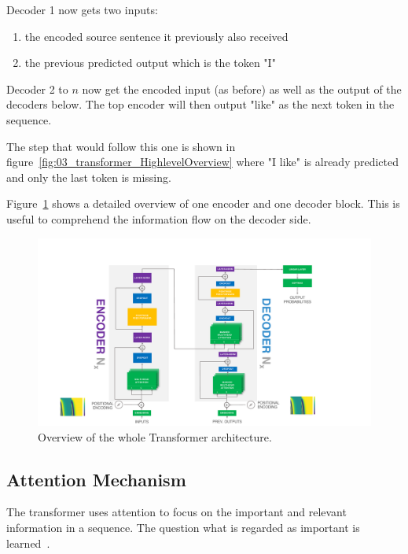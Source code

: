Decoder 1 now gets two inputs: 

\begin{enumerate}
	\item the encoded source sentence it previously also received
	\item the previous predicted output which is the token "I"
\end{enumerate}

Decoder 2 to $n$ now get the encoded input {(as before)} as well as the output of the decoders below. The top encoder will then output "like" as the next token in the sequence. 

The step that would follow this one is shown in figure~\ref{fig:03_transformer_HighlevelOverview} where "I like" is already predicted and only the last token is missing.
\bigskip

Figure~\ref{fig:03_transformer_overview} shows a detailed overview of one encoder and one decoder block. This is useful to comprehend the information flow on the decoder side.

\begin{figure}[t]
	\centering
	\includegraphics[width=\textwidth]{figures/03_theory/03_transformerArchitectureOverview}
	\caption{Overview of the whole Transformer architecture.}
	\label{fig:03_transformer_overview}
\end{figure}

\subsection{Attention Mechanism}

The transformer uses attention to focus on the important and relevant information in a sequence. The question what is regarded as important is learned~\cite{Vaswani2017d}.

